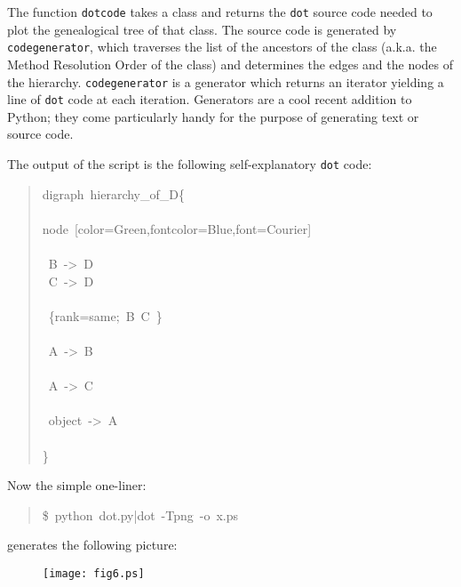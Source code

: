 \documentclass[10pt,english]{article}
\begin{document}
The function \texttt{dotcode} takes a class and returns the \texttt{dot} source
code needed to plot the genealogical tree of that class.  
The source code is generated by \texttt{codegenerator}, which traverses the list
of the ancestors of the class (a.k.a. the Method Resolution Order of
the class) and determines the edges and the nodes of the hierarchy. 
\texttt{codegenerator} is a generator which returns an iterator yielding 
a line of \texttt{dot} code at each iteration. Generators are a cool 
recent addition to Python; they come particularly handy for the purpose
of generating text or source code.

The output of the script is the following self-explanatory \texttt{dot} code:
\begin{quote}
\begin{ttfamily}\begin{flushleft}
\mbox{digraph~hierarchy{\_}of{\_}D{\{}}\\
\mbox{}\\
\mbox{node~[color=Green,fontcolor=Blue,font=Courier]}\\
\mbox{}\\
\mbox{~B~->~D}\\
\mbox{~C~->~D}\\
\mbox{}\\
\mbox{~{\{}rank=same;~B~C~{\}}}\\
\mbox{}\\
\mbox{~A~->~B}\\
\mbox{}\\
\mbox{~A~->~C}\\
\mbox{}\\
\mbox{~object~->~A}\\
\mbox{}\\
\mbox{{\}}}
\end{flushleft}\end{ttfamily}
\end{quote}

Now the simple one-liner:
\begin{quote}
\begin{ttfamily}\begin{flushleft}
\mbox{{\$}~python~dot.py|dot~-Tpng~-o~x.ps}
\end{flushleft}\end{ttfamily}
\end{quote}

generates the following picture:
\begin{figure}

\texttt{[image: fig6.ps]}
\end{figure}
\end{document}
